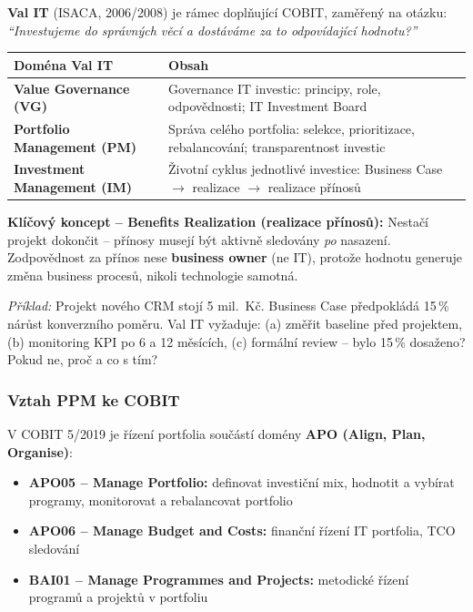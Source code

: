 \textbf{Val IT} (ISACA, 2006/2008) je rámec doplňující COBIT, zaměřený na otázku:
\textit{``Investujeme do správných věcí a dostáváme za to odpovídající hodnotu?''}

\begin{center}
\begin{tabular}{p{4cm}p{8cm}}
\toprule
\textbf{Doména Val IT} & \textbf{Obsah} \\
\midrule
\textbf{Value Governance (VG)} &
  Governance IT investic: principy, role, odpovědnosti; IT Investment Board \\
\textbf{Portfolio Management (PM)} &
  Správa celého portfolia: selekce, prioritizace, rebalancování; transparentnost investic \\
\textbf{Investment Management (IM)} &
  Životní cyklus jednotlivé investice: Business Case $\to$ realizace $\to$ realizace přínosů \\
\bottomrule
\end{tabular}
\end{center}

\textbf{Klíčový koncept -- Benefits Realization (realizace přínosů):}
Nestačí projekt dokončit -- přínosy musejí být aktivně sledovány \textit{po} nasazení.
Zodpovědnost za přínos nese \textbf{business owner} (ne IT), protože hodnotu generuje
změna business procesů, nikoli technologie samotná.

\textit{Příklad:} Projekt nového CRM stojí 5 mil.\ Kč. Business Case předpokládá 15\,\% nárůst konverzního poměru.
Val IT vyžaduje: (a) změřit baseline před projektem, (b) monitoring KPI po 6 a 12 měsících,
(c) formální review -- bylo 15\,\% dosaženo? Pokud ne, proč a co s tím?

\subsubsection{Vztah PPM ke COBIT}

V COBIT 5/2019 je řízení portfolia součástí domény \textbf{APO (Align, Plan, Organise)}:
\begin{itemize}
  \item \textbf{APO05 -- Manage Portfolio:} definovat investiční mix, hodnotit a vybírat programy,
    monitorovat a rebalancovat portfolio
  \item \textbf{APO06 -- Manage Budget and Costs:} finanční řízení IT portfolia, TCO sledování
  \item \textbf{BAI01 -- Manage Programmes and Projects:} metodické řízení programů a projektů v portfoliu
\end{itemize}


